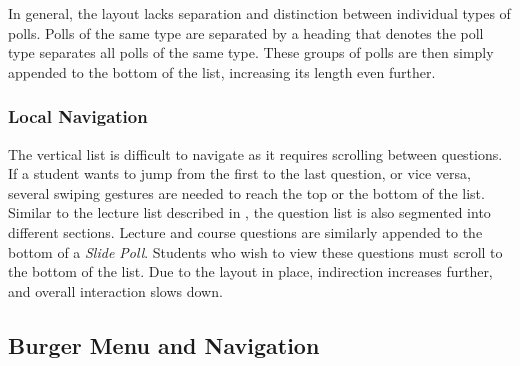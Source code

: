 In general, the layout lacks separation and distinction between individual types of polls.
Polls of the same type are separated by a heading that denotes the poll type separates all polls of the same type. These groups of polls are then simply appended to the bottom of the list, increasing its length even further.
\todogrf
\subsubsection{Local Navigation}

The vertical list is difficult to navigate as it requires scrolling between questions. If a student wants to jump from the first to the last question, or vice versa, several swiping gestures are needed to reach the top or the bottom of the list.
Similar to the lecture list described in , the question list is also segmented into different sections. Lecture and course questions are similarly appended to the bottom of a \emph{Slide Poll}. Students who wish to view these questions must scroll to the bottom of the list. Due to the layout in place, indirection increases further, and overall interaction slows down.



\subsection{Burger Menu and Navigation}
\label{section:con:problems:navigation}

